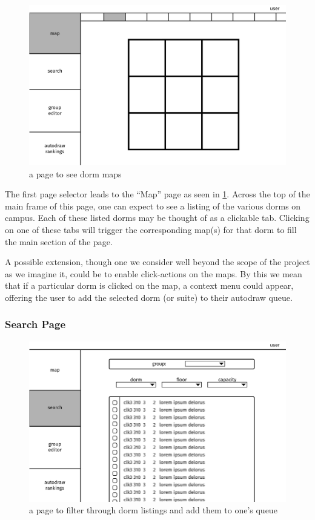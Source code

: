 \begin{figure} \centering
\includegraphics[scale=.15]{wireframe/map}
\caption{a page to see dorm maps}
\label{fig:wiremap}
\end{figure}

The first page selector leads to the ``Map'' page as seen in \cref{fig:wiremap}.
Across the top of the main frame of this page, one can expect to see a listing
of the various dorms on campus. Each of these listed dorms may be thought of as
a clickable tab. Clicking on one of these tabs will trigger the corresponding map(s) for that dorm to fill the main section of the page.

A possible extension, though one we consider well beyond the scope of the
project as we imagine it, could be to enable click-actions on the maps. By this
we mean that if a particular dorm is clicked on the map, a context menu could
appear, offering the user to add the selected dorm (or suite) to their autodraw
queue.

\subsubsection{Search Page}
\begin{figure} \centering
\includegraphics[scale=.15]{wireframe/search}
\caption{a page to filter through dorm listings and add them to one's queue}
\label{fig:wiresearch}
\end{figure}

